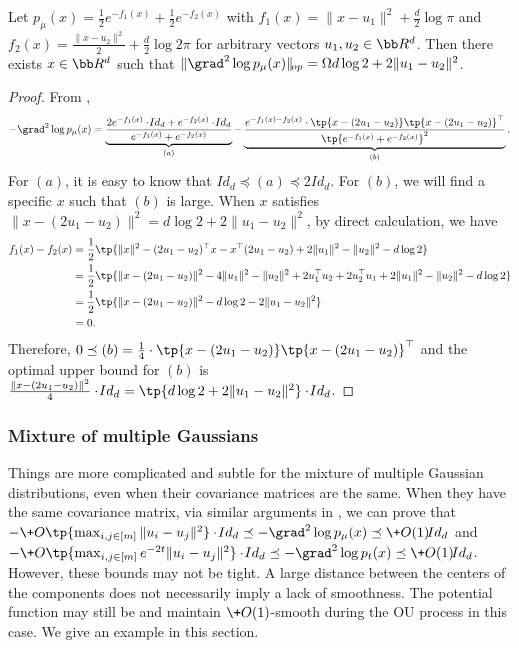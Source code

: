 \begin{lemma}\label{lem:2-diff}
    Let $p_{\mu}(x) = \frac{1}{2}e^{-f_1(x)} + \frac{1}{2}e^{-f_2(x)}$ with $f_1(x) = \|x-u_1\|^2 + \frac{d}{2}\log \pi$ and $f_2(x) = \frac{\|x-u_2\|^2}{2} + \frac{d}{2}\log 2\pi$ for arbitrary vectors $u_1,u_2\in \bb R^d$. Then there exists $x\in \bb R^d$ such that $\|\grad^2 \log p_{\mu}(x)\|_{\!{op}} = \Omega{d\log 2 + 2\|u_1-u_2\|^2}$.
\end{lemma}
\begin{proof}
    From , 
    \begin{align*}
        -\grad^2 \log p_{\mu}(x) = \underbrace{\frac{2e^{-f_1(x)}\cdot \!{Id}_d + e^{-f_2(x)}\cdot \!{Id}_d}{e^{-f_1(x)} + e^{-f_2(x)}}}_{(a)} - \underbrace{\frac{e^{-f_1(x)-f_2(x)}\cdot \tp{x-(2u_1-u_2)}\tp{x-(2u_1-u_2)}^{\top}}{\tp{e^{-f_1(x)} + e^{-f_2(x)}}^2}}_{(b)}.
    \end{align*}
    For $(a)$, it is easy to know that $\!{Id}_d\preceq (a) \preceq 2\!{Id}_d$. For $(b)$, we will find a specific $x$ such that $(b)$ is large.
    When $x$ satisfies $\|x - (2u_1-u_2)\|^2 = d\log 2 + 2\|u_1-u_2\|^2$, by direct calculation, we have 
    \begin{align*}
        f_1(x) - f_2(x) &= \frac{1}{2}\tp{\|x\|^2 - (2u_1-u_2)^{\top}x - x^{\top}(2u_1-u_2) + 2\|u_1\|^2 - \|u_2\|^2 - d\log 2} \\
        &= \frac{1}{2}\tp{\|x - (2u_1-u_2)\|^2 - 4\|u_1\|^2 - \|u_2\|^2 + 2u_1^{\top}u_2 + 2u_2^{\top}u_1 + 2\|u_1\|^2 - \|u_2\|^2 - d\log 2}  \\
        &= \frac{1}{2}\tp{\|x - (2u_1-u_2)\|^2 - d\log 2 - 2\|u_1-u_2\|^2} \\
        &= 0.
    \end{align*}
    Therefore, $0\preceq (b) = \frac{1}{4}\cdot \tp{x-(2u_1-u_2)}\tp{x-(2u_1-u_2)}^{\top}$ and the optimal upper bound for $(b)$ is $\frac{\|x-(2u_1-u_2)\|^2}{4}\cdot \!{Id}_d = \tp{d\log 2 + 2\|u_1-u_2\|^2}\cdot \!{Id}_d$.
\end{proof}


\subsubsection{Mixture of multiple Gaussians}
Things are more complicated and subtle for the mixture of multiple Gaussian distributions, even when their covariance matrices are the same. When they have the same covariance matrix, via similar arguments in , we can prove that $ -\+O\tp{\max_{i,j\in[m]}\|u_i-u_j\|^2}\cdot \!{Id}_d \preceq-\grad^2 \log p_{\mu}(x) \preceq \+O(1)\!{Id}_d$ and $ -\+O\tp{\max_{i,j\in[m]}e^{-2t}\|u_i-u_j\|^2}\cdot \!{Id}_d \preceq-\grad^2 \log p_t(x) \preceq \+O(1)\!{Id}_d$. However, these bounds may not be tight. A large distance between the centers of the components does not necessarily imply a lack of smoothness. The potential function may still be and maintain $\+O(1)$-smooth during the OU process in this case. We give an example in this section.

